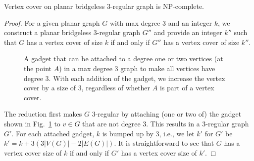 \begin{lemma}
Vertex cover on planar bridgeless $3$-regular graph is NP-complete.
\end{lemma}
\begin{proof}
For a given planar graph $G$ with max degree $3$ and an integer $k$,
we construct a planar bridgeless $3$-regular graph $G''$ and provide an 
integer $k''$ such that $G$ has a vertex cover of size $k$ if and only 
if $G''$ has a vertex cover of size $k''$.

\begin{figure}[ht]
    \vspace*{2mm}
    \centering
		\vspace*{2mm}
    \caption{A gadget that can be attached to a degree one or two vertices
		(at the point $A$) in a max degree $3$ graph to make all vertices have
		degree $3$. With each addition of the gadget, we increase the vertex 
		cover by a size of $3$, regardless of whether $A$ is part of a vertex 
		cover.}
    \label{fig:structure-hook}
\end{figure}

The reduction first makes $G$ $3$-regular by attaching (one or two of) the 
gadget shown in Fig.~\ref{fig:structure-hook} to $v \in G$ that are not 
degree $3$. This results in a $3$-regular graph $G'$. For each attached 
gadget, $k$ is bumped up by $3$, i.e., we let $k'$ for $G'$ be $k' = k 
+ 3(3|V(G)| - 2|E(G)|)$. It is straightforward to see that $G$ has a vertex 
cover size of $k$ if and only if $G'$ has a vertex cover size of $k'$.


\end{proof}
